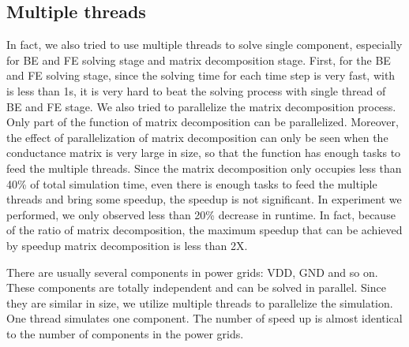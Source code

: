   \subsection{Multiple threads}
In fact, we also tried to use multiple threads to solve single component, especially for BE and FE solving stage and matrix decomposition stage. First, for the BE and FE solving stage, since the solving time for each time step is very fast, with is less than 1s, it is very hard 
to beat the solving process with single thread of BE and FE stage. We also tried to parallelize the matrix decomposition process. Only part of the function of matrix decomposition can be parallelized. Moreover, the effect of parallelization of matrix decomposition can only be seen when the conductance matrix is very large in size, so that the function has enough tasks to feed the multiple threads. Since the matrix decomposition only occupies less than 40\% of total simulation time, even there is enough tasks to feed the multiple threads and bring some speedup, the speedup is not significant. In experiment we performed, we only observed less than 20\% decrease in runtime. In fact, because of the ratio of matrix decomposition, the maximum speedup that can be achieved by speedup matrix decomposition is less than 2X.

There are usually several components in power grids: VDD, GND and so on. These components are totally independent and can be solved
in parallel. Since they are similar in size, we utilize multiple threads to parallelize the simulation. One thread simulates one component. The number of speed up is almost identical to the number of components in the power grids.

